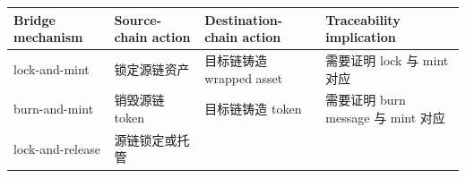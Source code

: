 \documentclass[12pt,a4paper]{ctexart}
\begin{document}
\begin{longtable}[]{@{}llll@{}}
\toprule
\begin{minipage}[b]{0.22\columnwidth}\raggedright
Bridge mechanism\strut
\end{minipage} & \begin{minipage}[b]{0.22\columnwidth}\raggedright
Source-chain action\strut
\end{minipage} & \begin{minipage}[b]{0.22\columnwidth}\raggedright
Destination-chain action\strut
\end{minipage} & \begin{minipage}[b]{0.22\columnwidth}\raggedright
Traceability implication\strut
\end{minipage}\tabularnewline
\midrule
\endhead
\begin{minipage}[t]{0.22\columnwidth}\raggedright
lock-and-mint\strut
\end{minipage} & \begin{minipage}[t]{0.22\columnwidth}\raggedright
锁定源链资产\strut
\end{minipage} & \begin{minipage}[t]{0.22\columnwidth}\raggedright
目标链铸造 wrapped asset\strut
\end{minipage} & \begin{minipage}[t]{0.22\columnwidth}\raggedright
需要证明 lock 与 mint 对应\strut
\end{minipage}\tabularnewline
\begin{minipage}[t]{0.22\columnwidth}\raggedright
burn-and-mint\strut
\end{minipage} & \begin{minipage}[t]{0.22\columnwidth}\raggedright
销毁源链 token\strut
\end{minipage} & \begin{minipage}[t]{0.22\columnwidth}\raggedright
目标链铸造 token\strut
\end{minipage} & \begin{minipage}[t]{0.22\columnwidth}\raggedright
需要证明 burn message 与 mint 对应\strut
\end{minipage}\tabularnewline
\begin{minipage}[t]{0.22\columnwidth}\raggedright
lock-and-release\strut
\end{minipage} & \begin{minipage}[t]{0.22\columnwidth}\raggedright
源链锁定或托管\strut
\end{minipage} & \begin{minipage}[t]{0.22\columnwidth}\raggedright

\end{minipage}
\end{longtable}
\end{document}
